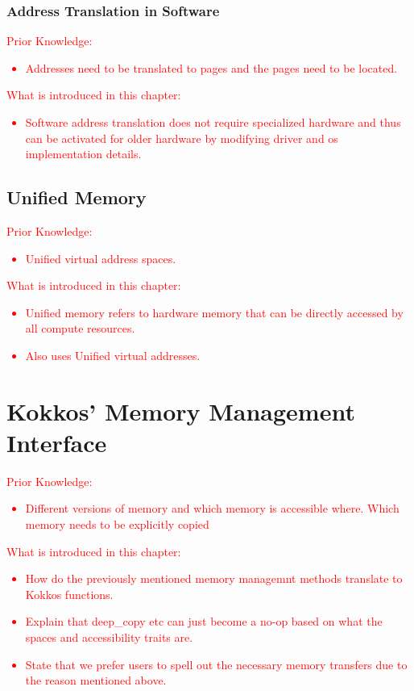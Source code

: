 \documentclass[a4paper,10pt]{scrartcl}
\newcommand\gist[1]{\textcolor{red}{#1}}
\begin{document}
\subsubsection{Address Translation in Software}
\gist{
  Prior Knowledge:
\begin{itemize}
\item Addresses need to be translated to pages and the pages need to be located.
\end{itemize}
  What is introduced in this chapter:
\begin{itemize}
\item Software address translation does not require specialized hardware and thus can be activated for older hardware by modifying driver and os implementation details.
\end{itemize}
}

\subsection{Unified Memory}
\gist{
  Prior Knowledge:
\begin{itemize}
\item Unified virtual address spaces.
\end{itemize}
  What is introduced in this chapter:
\begin{itemize}
\item Unified memory refers to hardware memory that can be directly accessed by all compute resources.
\item Also uses Unified virtual addresses.
\end{itemize}
}

\section{Kokkos' Memory Management Interface}
\gist{
  Prior Knowledge:
\begin{itemize}
\item Different versions of memory and which memory is accessible where. Which memory needs to be explicitly copied
\end{itemize}
  What is introduced in this chapter:
\begin{itemize}
\item How do the previously mentioned memory managemnt methods translate to Kokkos functions.
\item Explain that deep\_copy etc can just become a no-op based on what the spaces and accessibility traits are.
\item State that we prefer users to spell out the necessary memory transfers due to the reason mentioned above.
\end{itemize}
}
\end{document}
